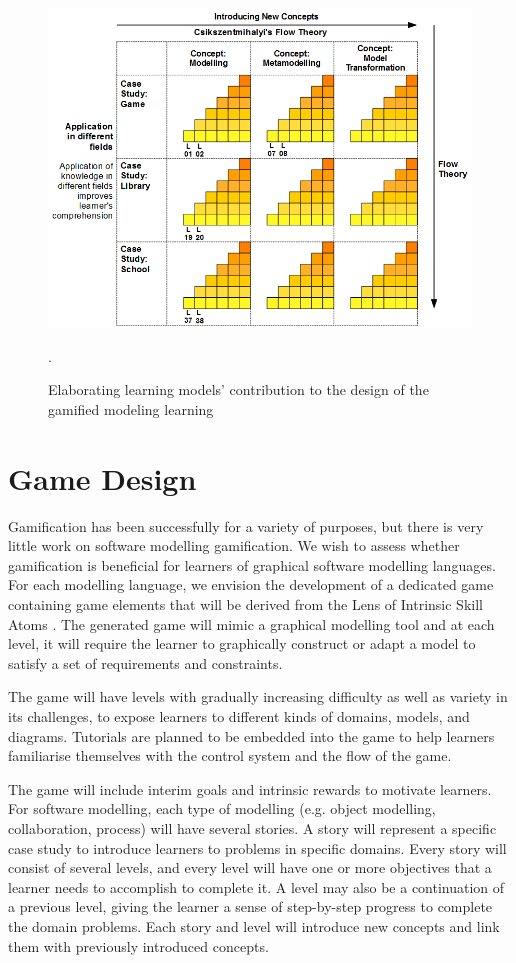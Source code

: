 \documentclass[12pt, a4paper]{report}
\begin{document}
\begin{figure}[ht]
\centering
\includegraphics[width=\textwidth]{learning-models2}
\caption{Elaborating learning models' contribution to the design of the gamified modeling learning}.
\label{learning-models2}
\end{figure}

\section{Game Design}
Gamification has been successfully for a variety of purposes, but there is very little work on software modelling gamification. We wish to assess whether gamification is beneficial for learners of graphical software modelling languages. For each modelling language, we envision the development of a dedicated game containing game elements that will be derived from the Lens of Intrinsic Skill Atoms \cite{deterding2015lens}. The generated game will mimic a graphical modelling tool and at each level, it will require the learner to graphically construct or adapt a model to satisfy a set of requirements and constraints.

The game will have levels with gradually increasing difficulty as well as variety in its challenges, to expose learners to different kinds of domains, models, and diagrams. Tutorials are planned to be embedded into the game to help learners familiarise themselves with the control system and the flow of the game. 

The game will include interim goals and intrinsic rewards to motivate learners. For software modelling, each type of modelling (e.g. object modelling, collaboration, process) will have several stories. A story will represent a specific case study to introduce learners to problems in specific domains. Every story will consist of several levels, and every level will have one or more objectives that a learner needs to accomplish to complete it. A level may also be a continuation of a previous level, giving the learner a sense of step-by-step progress to complete the domain problems. Each story and level will introduce new concepts and link them with previously introduced concepts.
\end{document}
